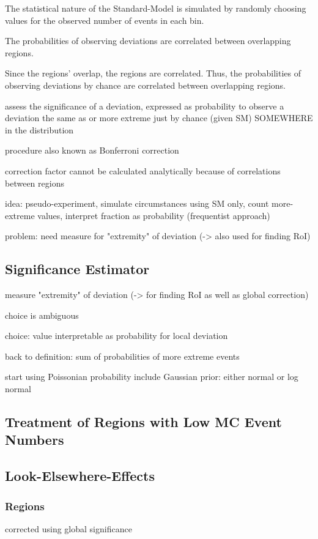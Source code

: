 The statistical nature of the Standard-Model is simulated by randomly choosing values for the observed number of events in each bin.




The probabilities of observing deviations are correlated between overlapping regions. 


Since the regions' overlap, the regions are correlated. Thus, the probabilities of observing deviations by chance are correlated between overlapping regions.

assess the significance of a deviation, expressed as probability to observe a deviation the same as or more extreme just by chance (given SM) SOMEWHERE in the distribution

procedure also known as Bonferroni correction

correction factor cannot be calculated analytically because of correlations between regions

idea: pseudo-experiment, simulate circumstances using SM only, count more-extreme values, interpret fraction as probability (frequentist  approach)

problem: need measure for "extremity" of deviation (-> also used for finding RoI)





\subsection{Significance Estimator}
measure "extremity" of deviation (-> for finding RoI as well as global correction)

choice is ambiguous

choice: value interpretable as probability for local deviation

back to definition: sum of probabilities of more extreme events

start using Poissonian probability
include Gaussian prior: either normal or log normal


\subsection{Treatment of Regions with Low \ac{MC} Event Numbers}


\subsection{Look-Elsewhere-Effects}
\subsubsection{Regions}
corrected using global significance 


